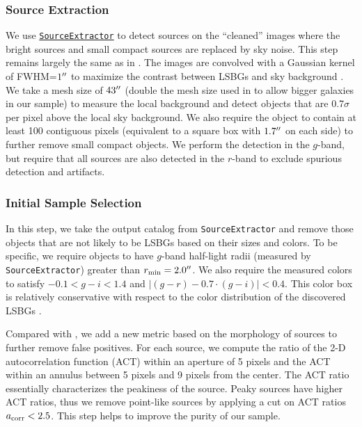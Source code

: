\documentclass[twocolumn,astrosymb,twocolappendix]{aastex631}
\newcommand{\code}[1]{\texttt{#1}}
\begin{document}
\begin{CJK*}{UTF8}{gbsn}
\subsubsection{Source Extraction}
We use \href{https://www.astromatic.net/software/sextractor/}{\code{SourceExtractor}} \citep{Bertin1996} to detect sources on the ``cleaned'' images where the bright sources and small compact sources are replaced by sky noise. This step remains largely the same as in . The images are convolved with a Gaussian kernel of FWHM=$1\mbox{$^{\prime\prime}$}$ to maximize the contrast between LSBGs and sky background \citep[e.g.,][]{Irwin1985,Akhlaghi2015,Greco2018}. We take a mesh size of $43\mbox{$^{\prime\prime}$}$ (double the mesh size used in  to allow bigger galaxies in our sample) to measure the local background and detect objects that are 0.7$\sigma$ per pixel above the local sky background. We also require the object to contain at least 100 contiguous pixels (equivalent to a square box with $1.7\mbox{$^{\prime\prime}$}$ on each side) to further remove small compact objects. We perform the detection in the $g$-band, but require that all sources are also detected in the $r$-band to exclude spurious detection and artifacts.
    
\subsubsection{Initial Sample Selection} 
In this step, we take the output catalog from \code{SourceExtractor} and remove those objects that are not likely to be LSBGs based on their sizes and colors. To be specific, we require objects to have $g$-band half-light radii (measured by \code{SourceExtractor}) greater than $r_{\rm min} = 2.0\mbox{$^{\prime\prime}$}$. We also require the measured colors to satisfy $-0.1 < g-i < 1.4$ and $|(g-r) - 0.7\cdot (g-i)| < 0.4$. This color box is relatively conservative with respect to the color distribution of the discovered LSBGs \citep[e.g.,][]{SAGA-I,Greco2018,Zaritsky2019,Tanoglidis2021}. 

Compared with , we add a new metric based on the morphology of sources to further remove false positives. For each source, we compute the ratio of the 2-D autocorrelation function (ACT) within an aperture of 5 pixels and the ACT within an annulus between 5 pixels and 9 pixels from the center. The ACT ratio essentially characterizes the peakiness of the source. Peaky sources have higher ACT ratios, thus we remove point-like sources by applying a cut on ACT ratios $a_{\rm corr} < 2.5$. This step helps to improve the purity of our sample.


\end{CJK*}
\end{document}

